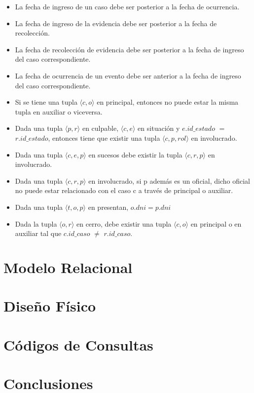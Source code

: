 \documentclass[11pt, a4paper]{article}
\begin{document}
\begin{itemize}
\item La fecha de ingreso de un caso debe ser posterior a la fecha de ocurrencia.

\item La fecha de ingreso de la evidencia debe ser posterior a la fecha de recolección.

\item La fecha de recolección de evidencia debe ser posterior a la fecha de ingreso del caso correspondiente.

\item La fecha de ocurrencia de un evento debe ser anterior a la fecha de ingreso del caso correspondiente.

\item Si se tiene una tupla $\langle c,o\rangle$ en principal, entonces no puede estar la misma tupla en auxiliar o viceversa.

\item Dada una tupla $\langle p,r \rangle$ en culpable, $\langle c,e \rangle$ en situación y $e.id\_estado$ $=$ $r.id\_estado$, entonces tiene que existir una tupla $\langle c,p,rol \rangle$ en involucrado.

\item Dada una tupla $\langle c,e,p \rangle$ en sucesos debe existir la tupla $\langle c,r,p \rangle$ en involucrado.

\item Dada una tupla $\langle c,r,p \rangle$ en involucrado, si p además es un oficial, dicho oficial no puede estar relacionado con el caso c a través de principal o auxiliar.

\item Dada una tupla $\langle t,o,p \rangle$ en presentan, $o.dni = p.dni$

\item Dada la tupla $\langle o,r \rangle$ en cerro, debe existir una tupla $\langle c,o \rangle$ en principal o en auxiliar tal que $c.id\_caso$ $\neq$ $r.id\_caso$.
\end{itemize}

\newpage
\section{Modelo Relacional}



\section{Diseño Físico}

\section{Códigos de Consultas}

\section{Conclusiones}
\end{document}
